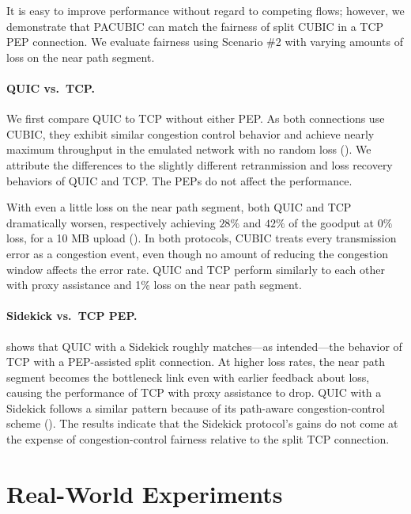 It is easy to improve performance without regard to competing flows;
however, we demonstrate that PACUBIC can
match the fairness of split CUBIC in a TCP PEP connection\@.
We evaluate fairness using Scenario \#2 with varying amounts of loss on the
near path segment.

\paragraph{QUIC vs.\ TCP\@.}
We first compare QUIC to TCP without either PEP\@.
As both connections use CUBIC, they exhibit similar
congestion control behavior and achieve nearly maximum throughput in the
emulated network with no random loss ().
We attribute the differences to the slightly different retranmission and
loss recovery behaviors of QUIC and TCP\@. The PEPs do not affect the
performance.

With even a little loss on the near path segment, both QUIC and TCP dramatically
worsen, respectively achieving $28\%$ and $42\%$ of the goodput at $0\%$ loss,
for a 10 MB upload ().
In both protocols, CUBIC treats every transmission error as a congestion event,
even though no amount of reducing the congestion window affects the error rate.
QUIC and TCP perform similarly to each other with proxy assistance and 1\%
loss on the near path segment.

\paragraph{Sidekick vs.\ TCP PEP\@.}
 shows that QUIC with a Sidekick roughly matches---as
 intended---the behavior of TCP with a PEP-assisted split connection. At higher
loss rates, the near path segment becomes the bottleneck link even with earlier
feedback about loss, causing the performance of TCP with proxy assistance to
drop. QUIC with a Sidekick follows a similar pattern because of its path-aware
congestion-control scheme (). The
results indicate that the Sidekick protocol's gains do not come at the expense
of congestion-control fairness relative to the split TCP connection.

\section{Real-World Experiments}
\label{sec:sidekick:evaluation:real-world}

